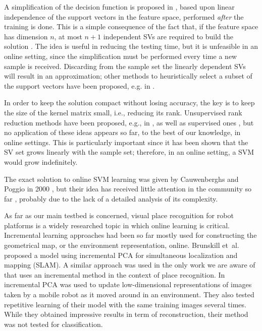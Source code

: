 A simplification of the decision function is proposed in
\cite{DownsGM01}, based upon linear independence of the support
vectors in the feature space, performed \emph{after} the training is
done. This is a simple consequence of the fact that, if the feature
space has dimension $n$, at most $n+1$ independent SVs are required to
build the solution \cite{PontilV98}. The idea is useful in reducing
the testing time, but it is unfeasible in an online setting, since the
simplification must be performed every time a new sample is received.
Discarding from the sample set the linearly dependent SVs will result
in an approximation; other methods to heuristically select a subset of
the support vectors have been proposed, e.g. in
\cite{LeeM01,schoel06,KeerthiCDC06}.

In order to keep the solution compact without losing accuracy, the key
is to keep the size of the kernel matrix small, i.e., reducing its
rank. Unsupervised rank reduction methods have been proposed, e.g., in
\cite{Baudat03}, as well as supervised ones
\cite{BachJordan2005,KeerthiCDC06}, but no application of these ideas
appears so far, to the best of our knowledge, in online settings. This
is particularly important since it has been shown \cite{Steinwart03}
that the SV set grows linearly with the sample set; therefore, in an
online setting, a SVM would grow indefinitely.

The exact solution to online SVM learning was given by Cauwenberghs
and Poggio in 2000 \cite{CauwenberghsP00}, but their idea has received
little attention in the community so far \cite{Laskov2006}, probably
due to the lack of a detailed analysis of its complexity.

As far as our main testbed is concerned, visual place recognition for
robot platforms is a widely researched topic in which online learning
is critical. Incremental learning approaches had been so far mostly
used for constructing the geometrical map, or the environment
representation, online.  Brunskill et~al. \cite{emma:irca05} proposed
a model using incremental PCA for simultaneous localization and
mapping (SLAM). A similar approach was used in the only work we are
aware of that uses an incremental method in the context of place
recognition. In \cite{ljubjiana:icra02} incremental PCA was used to
update low-dimensional representations of images taken by a mobile
robot as it moved around in an environment. They also tested
repetitive learning of their model with the same training images
several times. While they obtained impressive results in term of
reconstruction, their method was not tested for classification.
